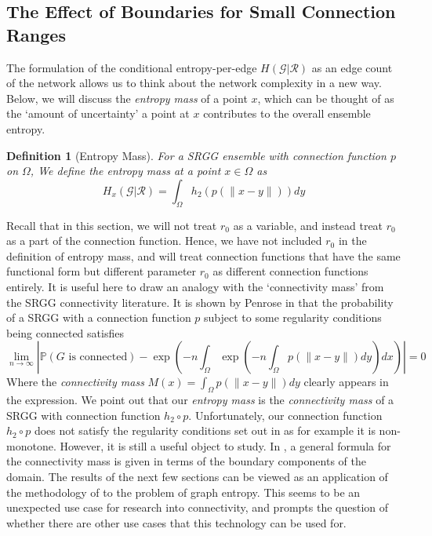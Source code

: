 \documentclass{article}
\newtheorem{definition}{Definition}
\newcommand{\graph}{\mathcal{G}}
\newcommand{\prob}[1]{\mathbb{P}\left(#1\right)}
\begin{document}
    \subsection{The Effect of Boundaries for Small Connection Ranges}
    The formulation of the conditional entropy-per-edge $H(\graph|\mathcal{R})$ as an edge count of the network allows us to think about the network complexity in a new way. Below, we will discuss the \textit{entropy mass} of a point $x$, which can be thought of as the `amount of uncertainty' a point at $x$ contributes to the overall ensemble entropy.
    \begin{definition}[Entropy Mass]
        For a SRGG ensemble with connection function $p$ on $\Omega$, We define the entropy mass at a point $x \in \Omega$ as
        \begin{equation}
            H_x(\graph|\mathcal{R}) = \int_{\Omega} h_2(p(\|x-y\|))dy
        \end{equation}
    \end{definition}
    Recall that in this section, we will not treat $r_0$ as a variable, and instead treat $r_0$ as a part of the connection function. Hence, we have not included $r_0$ in the definition of entropy mass, and will treat connection functions that have the same functional form but different parameter $r_0$ as different connection functions entirely. It is useful here to draw an analogy with the `connectivity mass' from the SRGG connectivity literature. It is shown by Penrose in \cite{penrose2016connectivity} that the probability of a SRGG with a connection function $p$ subject to some regularity conditions being connected satisfies
    \begin{equation}
        \lim_{n\rightarrow\infty} \left|\prob{G \text{ is connected}} - \exp\left(-n\int_{\Omega} \exp\left(-n\int_{\Omega}p(\|x-y\|)dy\right)dx\right)\right|= 0
    \end{equation}
    Where the \textit{connectivity mass} $M(x) = \int_\Omega p(\|x-y\|)dy$ clearly appears in the expression. We point out that our \textit{entropy mass} is the \textit{connectivity mass} of a SRGG with connection function $h_2\circ p$. Unfortunately, our connection function $h_2 \circ p$ does not satisfy the regularity conditions set out in \cite{penrose2016connectivity} as for example it is non-monotone. However, it is still a useful object to study. In \cite{dettmann2016random}, a general formula for the connectivity mass is given in terms of the boundary components of the domain. The results of the next few sections can be viewed as an application of the methodology of \cite{dettmann2016random} to the problem of graph entropy. This seems to be an unexpected use case for research into connectivity, and prompts the question of whether there are other use cases that this technology can be used for. 
    
\end{document}
